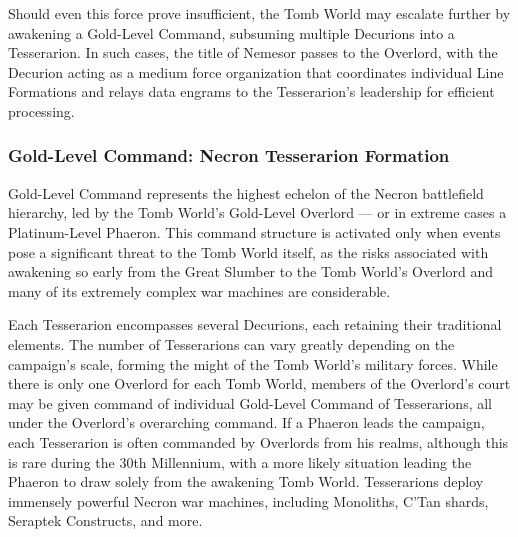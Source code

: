 Should even this force prove insufficient, the Tomb World may escalate further by awakening a Gold-Level Command, subsuming multiple Decurions into a Tesserarion. In such cases, the title of Nemesor passes to the Overlord, with the Decurion acting as a medium force organization that coordinates individual Line Formations and relays data engrams to the Tesserarion’s leadership for efficient processing.


\subsubsection{Gold-Level Command: Necron Tesserarion Formation}

Gold-Level Command represents the highest echelon of the Necron battlefield hierarchy, led by the Tomb World's Gold-Level Overlord — or in extreme cases a Platinum-Level Phaeron. This command structure is activated only when events pose a significant threat to the Tomb World itself, as the risks associated with awakening so early from the Great Slumber to the Tomb World's Overlord and many of its extremely complex war machines are considerable.

Each Tesserarion encompasses several Decurions, each retaining their traditional elements. The number of Tesserarions can vary greatly depending on the campaign's scale, forming the might of the Tomb World’s military forces. While there is only one Overlord for each Tomb World, members of the Overlord's court may be given command of individual Gold-Level Command of Tesserarions, all under the Overlord's overarching command. If a Phaeron leads the campaign, each Tesserarion is often commanded by Overlords from his realms, although this is rare during the 30th Millennium, with a more likely situation leading the Phaeron to draw solely from the awakening Tomb World. Tesserarions deploy immensely powerful Necron war machines, including Monoliths, C’Tan shards, Seraptek Constructs, and more.

